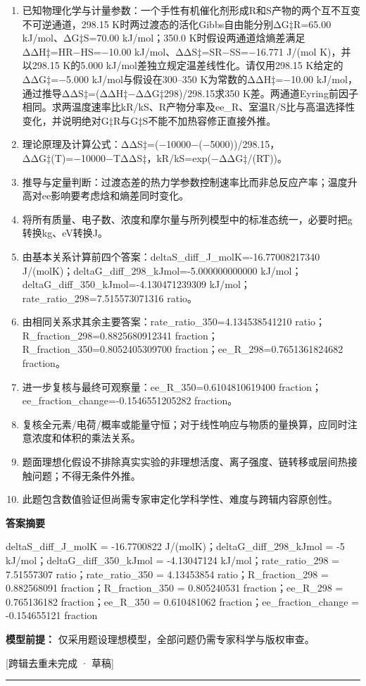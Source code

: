 \documentclass[UTF8,11pt,a4paper]{ctexart}
\begin{document}
\begin{enumerate}
\item 已知物理化学与计量参数：一个手性有机催化剂形成R和S产物的两个互不互变不可逆通道，298.15 K时两过渡态的活化Gibbs自由能分别ΔG‡R=65.00 kJ/mol、ΔG‡S=70.00 kJ/mol；350.0 K时假设两通道焓熵差满足ΔΔH‡=HR−HS=−10.00 kJ/mol、ΔΔS‡=SR−SS=−16.771 J/(mol K)，并以298.15 K的5.000 kJ/mol差独立规定温差线性化。请仅用298.15 K给定的ΔΔG‡=−5.000 kJ/mol与假设在300–350 K为常数的ΔΔH‡=−10.00 kJ/mol，通过推导ΔΔS‡=(ΔΔH‡−ΔΔG‡298)/298.15求350 K差。两通道Eyring前因子相同。求两温度速率比kR/kS、R产物分率及ee\_R、室温R/S比与高温选择性变化，并说明绝对G‡R与G‡S不能不加热容修正直接外推。
\item 理论原理及计算公式：ΔΔS‡=(−10000−(−5000))/298.15，ΔΔG‡(T)=−10000−TΔΔS‡，kR/kS=exp(−ΔΔG‡/(RT))。
\item 推导与定量判断：过渡态差的热力学参数控制速率比而非总反应产率；温度升高对ee影响要考虑焓和熵差同时变化。
\item 将所有质量、电子数、浓度和摩尔量与所列模型中的标准态统一，必要时把g转换kg、eV转换J。
\item 由基本关系计算前四个答案：deltaS\_diff\_J\_molK=-16.77008217340 J/(molK)；deltaG\_diff\_298\_kJmol=-5.000000000000 kJ/mol；deltaG\_diff\_350\_kJmol=-4.130471239309 kJ/mol；rate\_ratio\_298=7.515573071316 ratio。
\item 由相同关系求其余主要答案：rate\_ratio\_350=4.134538541210 ratio；R\_fraction\_298=0.8825680912341 fraction；R\_fraction\_350=0.8052405309700 fraction；ee\_R\_298=0.7651361824682 fraction。
\item 进一步复核与最终可观察量：ee\_R\_350=0.6104810619400 fraction；ee\_fraction\_change=-0.1546551205282 fraction。
\item 复核全元素/电荷/概率或能量守恒；对于线性响应与物质的量换算，应同时注意浓度和体积的乘法关系。
\item 题面理想化假设不排除真实实验的非理想活度、离子强度、链转移或层间热接触问题；不得无条件外推。
\item 此题包含数值验证但尚需专家审定化学科学性、难度与跨辑内容原创性。
\end{enumerate}
\noindent\textbf{答案摘要}\par
deltaS\_diff\_J\_molK = -16.7700822 J/(molK)；deltaG\_diff\_298\_kJmol = -5 kJ/mol；deltaG\_diff\_350\_kJmol = -4.13047124 kJ/mol；rate\_ratio\_298 = 7.51557307 ratio；rate\_ratio\_350 = 4.13453854 ratio；R\_fraction\_298 = 0.882568091 fraction；R\_fraction\_350 = 0.805240531 fraction；ee\_R\_298 = 0.765136182 fraction；ee\_R\_350 = 0.610481062 fraction；ee\_fraction\_change = -0.154655121 fraction\par
\noindent\textbf{模型前提：}
仅采用题设理想模型，全部问题仍需专家科学与版权审查。\par
\noindent\textcolor{red!65!black}{[跨辑去重未完成 · 草稿]} \par
\medskip\hrule\medskip
{}
\end{document}
